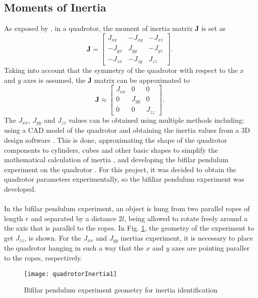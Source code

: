 \subsection{Moments of Inertia}
As exposed by \cite{Lee2011}, in a quadrotor, the moment of inertia matrix $\mathbf{J}$ is set as
\begin{equation}
\mathbf{J} = \begin{bmatrix}
J_{xx} & -J_{xy} & -J_{xz} \\
-J_{yx} & J_{yy} & -J_{yz} \\
-J_{zx} & -J_{zy} & J_{zz}
\end{bmatrix}.
\end{equation}
Taking into account that the symmetry of the quadrotor with respect to the $x$ and $y$ axes is assumed, the $\mathbf{J}$ matrix can be approximated to
\begin{equation}
\mathbf{J}  	\approx  \begin{bmatrix}
J_{xx} & 0 & 0 \\
0 & J_{yy} & 0 \\
0 & 0 & J_{zz}
\end{bmatrix}.
\end{equation}
The $J_{xx}$, $J_{yy}$ and $J_{zz}$ values can be obtained using multiple methods including: using a CAD model of the quadrotor and obtaining the inertia values from a 3D design software \cite{Khodja2017}. This is done, approximating the shape of the quadrotor components to cylinders, cubes and other basic shapes to simplify the mathematical calculation of inertia \cite{Tomas2011}, and developing the bifilar pendulum experiment on the quadrotor \cite{Garcia2017}. For this project, it was decided to obtain the quadrotor parameters experimentally, so the bifiliar pendulum experiment was developed.
\\\\
In the bifilar pendulum experiment, an object is hung from two parallel ropes of length $r$ and separated by a distance $2l$, being allowed to rotate freely around a the axis that is parallel to the ropes. In Fig. \ref{fig:bifilar}, the geometry of the experiment to get  $J_{zz}$, is shown. For the $J_{xx}$ and $J_{yy}$ inertias experiment, it is necessary to place the quadrotor hanging in such a way that the $x$ and $y$ axes are pointing paraller to the ropes, respectively.
\begin{figure}[h]
	\begin{center}
		\texttt{[image: quadrotorInertia1]}    
		\caption{Bifilar pendulum experiment geometry for inertia identification} 
		\label{fig:bifilar}
	\end{center}
\end{figure}
